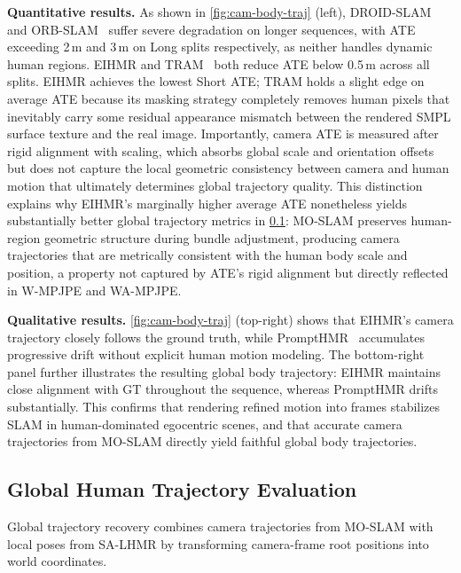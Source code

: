 \documentclass[runningheads]{llncs}
\begin{document}
\noindent\textbf{Quantitative results.}
As shown in \cref{fig:cam-body-traj} (left), DROID-SLAM~\cite{DROIDSLAM2021} and ORB-SLAM~\cite{ORBSLAM3} suffer severe degradation on longer sequences, with ATE exceeding 2\,m and 3\,m on Long splits respectively, as neither handles dynamic human regions. EIHMR and TRAM~\cite{TRAM2024} both reduce ATE below 0.5\,m across all splits. EIHMR achieves the lowest Short ATE; TRAM holds a slight edge on average ATE because its masking strategy completely removes human pixels that inevitably carry some residual appearance mismatch between the rendered SMPL surface texture and the real image. Importantly, camera ATE is measured after rigid alignment with scaling, which absorbs global scale and orientation offsets but does not capture the local geometric consistency between camera and human motion that ultimately determines global trajectory quality. This distinction explains why EIHMR's marginally higher average ATE nonetheless yields substantially better global trajectory metrics in \cref{sec:exp-global}: MO-SLAM preserves human-region geometric structure during bundle adjustment, producing camera trajectories that are metrically consistent with the human body scale and position, a property not captured by ATE's rigid alignment but directly reflected in W-MPJPE and WA-MPJPE.

\noindent\textbf{Qualitative results.}
\cref{fig:cam-body-traj} (top-right) shows that EIHMR's camera trajectory closely follows the ground truth, while PromptHMR~\cite{PromptHMR2024} accumulates progressive drift without explicit human motion modeling. The bottom-right panel further illustrates the resulting global body trajectory: EIHMR maintains close alignment with GT throughout the sequence, whereas PromptHMR drifts substantially. This confirms that rendering refined motion into frames stabilizes SLAM in human-dominated egocentric scenes, and that accurate camera trajectories from MO-SLAM directly yield faithful global body trajectories.



\subsection{Global Human Trajectory Evaluation}
\label{sec:exp-global}

Global trajectory recovery combines camera trajectories from MO-SLAM with local poses from SA-LHMR by transforming camera-frame root positions into world coordinates.
\end{document}

